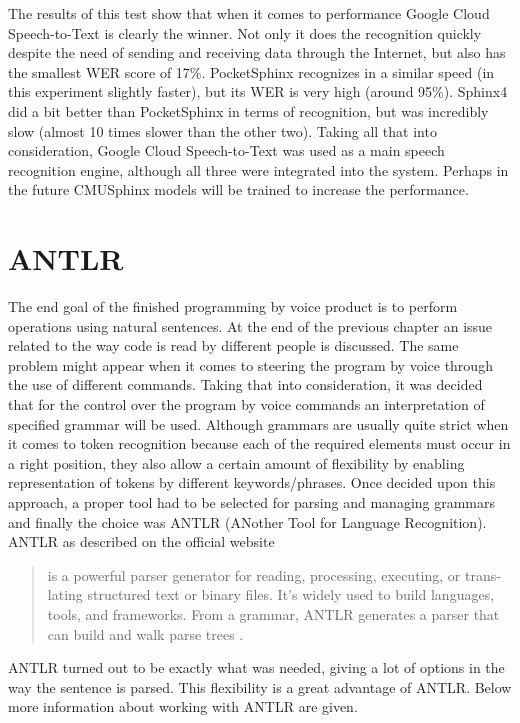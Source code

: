 The results of this test show that when it comes to performance Google Cloud Speech-to-Text is clearly the winner. Not only it does the recognition quickly despite the need of sending and receiving data through the Internet, but also has the smallest WER score of 17\%. PocketSphinx recognizes in a similar speed (in this experiment slightly faster), but its WER is very high (around 95\%). Sphinx4 did a bit better than PocketSphinx in terms of recognition, but was incredibly slow (almost 10 times slower than the other two). Taking all that into consideration, Google Cloud Speech-to-Text was used as a main speech recognition engine, although all three were integrated into the system. Perhaps in the future CMUSphinx models will be trained to increase the performance.

\section{ANTLR}

The end goal of the finished programming by voice product is to perform operations using natural sentences. At the end of the previous chapter an issue related to the way code is read by different people is discussed. The same problem might appear when it comes to steering the program by voice through the use of different commands. Taking that into consideration, it was decided that for the control over the program by voice commands an interpretation of specified grammar will be used. Although grammars are usually quite strict when it comes to token recognition because each of the required elements must occur in a right position, they also allow a certain amount of flexibility by enabling representation of tokens by different keywords/phrases. Once decided upon this approach, a proper tool had to be selected for parsing and managing grammars and finally the choice was ANTLR (ANother Tool for Language Recognition). ANTLR as described on the official website 
\begin{quote}
    \begin{english}
   is a powerful parser generator for reading, processing, executing, or translating structured text or binary files. It's widely used to build languages, tools, and frameworks. From a grammar, ANTLR generates a parser that can build and walk parse trees \cite{ANTLR2019}.
    \end{english}
 \end{quote}
ANTLR turned out to be exactly what was needed, giving a lot of options in the way the sentence is parsed. This flexibility is a great advantage of ANTLR. Below more information about working with ANTLR are given.

